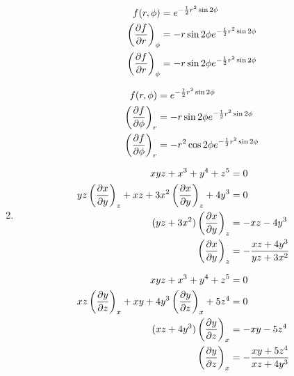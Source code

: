 \documentclass[10pt,\jkfside,a4paper]{article}
\begin{document}
\begin{enumerate}
\begin{enumerate}
\begin{equation}
\begin{split}
f(r, \phi) &= e^{-\frac{1}{2}r^2 \sin 2 \phi} \\
\left(\pdv{f}{r}\right)_\phi &= -r \sin 2 \phi e^{-\frac{1}{2}r^2 \sin 2 \phi} \\
\left(\pdv{f}{r}\right)_\phi &= -r \sin 2 \phi e^{-\frac{1}{2}r^2 \sin 2 \phi} \\
\end{split}
\end{equation}

\begin{equation}
\begin{split}
f(r, \phi) &= e^{-\frac{1}{2}r^2 \sin 2 \phi} \\
\left(\pdv{f}{\phi}\right)_r &= -r \sin 2 \phi e^{-\frac{1}{2}r^2 \sin 2 \phi} \\
\left(\pdv{f}{\phi}\right)_r &= -r^2 \cos 2 \phi e^{-\frac{1}{2}r^2 \sin 2 \phi} \\
\end{split}
\end{equation}

\end{enumerate}

\item
\begin{equation}
\begin{split}
xyz + x^3 + y^4 + z^5 &= 0 \\
yz\left(\pdv{x}{y}\right)_z + xz + 3x^2\left(\pdv{x}{y}\right)_z + 4y^3 &= 0 \\
(yz + 3x^2)\left(\pdv{x}{y}\right)_z &= - xz - 4y^3 \\
\left(\pdv{x}{y}\right)_z &= -\frac{xz + 4y^3}{yz + 3x^2} \\
\end{split}
\end{equation}

\begin{equation}
\begin{split}
xyz + x^3 + y^4 + z^5 &= 0 \\
xz\left(\pdv{y}{z}\right)_x + xy + 4y^3\left(\pdv{y}{z}\right)_x + 5z^4 &= 0 \\
(xz + 4y^3)\left(\pdv{y}{z}\right)_x &= -xy - 5z^4 \\
\left(\pdv{y}{z}\right)_x &= -\frac{xy + 5z^4}{xz + 4y^3} \\
\end{split}
\end{equation}


\end{enumerate}
\end{document}
